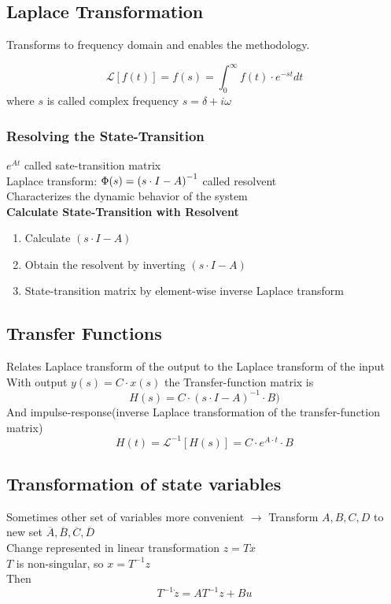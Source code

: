 \subsection{Laplace Transformation}%
\label{dls:sub:laplace_transformation}
Transforms to frequency domain and enables the methodology.

\[\mathcal{L}[f(t)] = f(s) = \int_0^\infty f(t) \cdot e^{-st}dt\]
where \(s\) is called complex frequency \(s = \delta + i\omega\)

\subsubsection{Resolving the State-Transition}%
\label{dls:ssub:resolving_the_state_transition}
\(e^{At}\) called sate-transition matrix\\
Laplace transform: \(\Phi(s) = {(s \cdot I - A)}^{-1}\) called resolvent\\
Characterizes the dynamic behavior of the system\\

\textbf{Calculate State-Transition with Resolvent}
\begin{enumerate}
\item Calculate \((s \cdot I - A)\)
\item Obtain the resolvent by inverting \((s \cdot I - A)\)
\item State-transition matrix by element-wise inverse Laplace transform
\end{enumerate}

\subsection{Transfer Functions}%
\label{dls:sub:transfer_functions}
Relates Laplace transform of the output to the Laplace transform of the input\\
With output \(y(s) = C \cdot x(s)\)  the Transfer-function matrix is
\[H(s) = C \cdot {(s \cdot I - A)}^{-1} \cdot B)\]
And impulse-response(inverse Laplace transformation of the transfer-function matrix)
\[H(t) = \mathcal{L}^{-1} [H(s)] = C \cdot e^{A \cdot t} \cdot B\]

\subsection{Transformation of state variables}%
\label{dls:sub:transformation_of_state_variables}
Sometimes other set of variables more convenient
\(\rightarrow\) Transform \(A, B, C, D\) to new set \(\overline{A}, \overline{B}, \overline{C}, \overline{D}\)\\
Change represented in linear transformation \(z=Tx\)\\
\(T\) is non-singular, so \(x = T^{-1}z\)\\
Then \[T^{-1}\dot{z} = AT^{-1}z + Bu\]